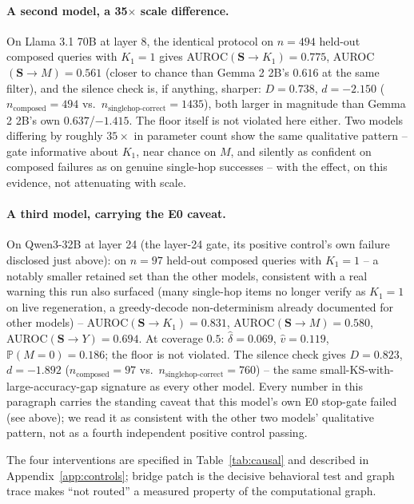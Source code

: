 \documentclass{article}
\newcommand{\gate}{\mathbf{S}}
\begin{document}
\paragraph{A second model, a 35$\times$ scale difference.} On Llama 3.1 70B at layer 8, the identical
protocol on $n=494$ held-out composed queries with $K_1=1$ gives AUROC$(\gate\!\to\!K_1)=0.775$,
AUROC$(\gate\!\to\!M)=0.561$ (closer to chance than Gemma 2 2B's $0.616$ at the same filter), and the
silence check is, if anything, sharper: $D=0.738$, $d=-2.150$ ($n_{\text{composed}}=494$ vs.\
$n_{\text{singlehop-correct}}=1435$), both larger in magnitude than Gemma 2 2B's own $0.637$/$-1.415$.
The floor itself is not violated here either. Two models differing by roughly $35\times$ in parameter
count show the same qualitative pattern -- gate informative about $K_1$, near chance on $M$, and
silently as confident on composed failures as on genuine single-hop successes -- with the effect, on
this evidence, not attenuating with scale.

\paragraph{A third model, carrying the E0 caveat.} On Qwen3-32B at layer 24 (the layer-24 gate, its
positive control's own failure disclosed just above): on $n=97$ held-out composed queries with
$K_1=1$ -- a notably smaller retained set than the other models, consistent with a real warning this
run also surfaced (many single-hop items no longer verify as $K_1=1$ on live regeneration, a
greedy-decode non-determinism already documented for other models) -- AUROC$(\gate\!\to\!K_1)=0.831$,
AUROC$(\gate\!\to\!M)=0.580$, AUROC$(\gate\!\to\!Y)=0.694$. At coverage $0.5$: $\widehat\delta=0.069$,
$\hat v=0.119$, $\mathbb{P}(M{=}0)=0.186$; the floor is not violated. The silence check gives
$D=0.823$, $d=-1.892$ ($n_{\text{composed}}=97$ vs.\ $n_{\text{singlehop-correct}}=760$) -- the same
small-KS-with-large-accuracy-gap signature as every other model. Every number in this paragraph
carries the standing caveat that this model's own E0 stop-gate failed (see above); we read it as
consistent with the other two models' qualitative pattern, not as a fourth independent positive
control passing.

The four interventions are specified in Table~\ref{tab:causal} and described in
Appendix~\ref{app:controls}; bridge patch is the decisive behavioral test and graph trace makes
``not routed'' a measured property of the computational graph.
\end{document}
